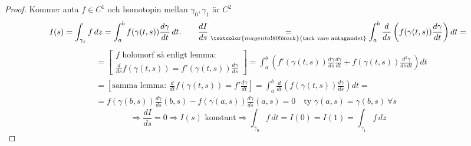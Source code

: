 \begin{proof}
Kommer anta $f \in C^1$ och homotopin mellan $\gamma_0, \gamma_1$ är $C^2$
\[ I(s) = \int_{\gamma_s} f\,dz = \int_a^b f(\gamma(t, s)) \frac{d\gamma}{dt}\,dt. \qquad \frac{dI}{ds} \underset{\textcolor{magenta!80!black}{\text{tack vare antagandet}}}{=} \int_a^b \frac{d}{ds}\left( f(\gamma(t, s)) \frac{d\gamma}{dt} \right) dt = \]
\begin{align*}
  &= \left[ \begin{array}{l} f \text{ holomorf så enligt lemma:} \\ \frac{d}{ds} f(\gamma(t, s)) = f'(\gamma(t, s)) \frac{d\gamma}{ds} \end{array} \right] = \int_a^b \left( f'(\gamma(t, s)) \frac{d\gamma}{ds}\frac{d\gamma}{dt} + f(\gamma(t, s)) \frac{d^2\gamma}{ds\,dt} \right) dt \\
  &= \left[ \text{samma lemma: } \frac{d}{dt} f(\gamma(t, s)) = f' \frac{d\gamma}{dt} \right] = \int_a^b \frac{d}{dt}\left( f(\gamma(t, s)) \frac{d\gamma}{ds} \right) dt = \\
  &= f(\gamma(b, s)) \frac{d\gamma}{ds}(b, s) - f(\gamma(a, s)) \frac{d\gamma}{ds}(a, s) = 0 \quad \text{ty } \gamma(a, s) = \gamma(b, s) \ \forall s
\end{align*}
\[ \Rightarrow \frac{dI}{ds} = 0 \Rightarrow I(s) \text{ konstant} \Rightarrow \int_{\gamma_0} f\,dt = I(0) = I(1) = \int_{\gamma_1} f\,dz \]
\end{proof}
